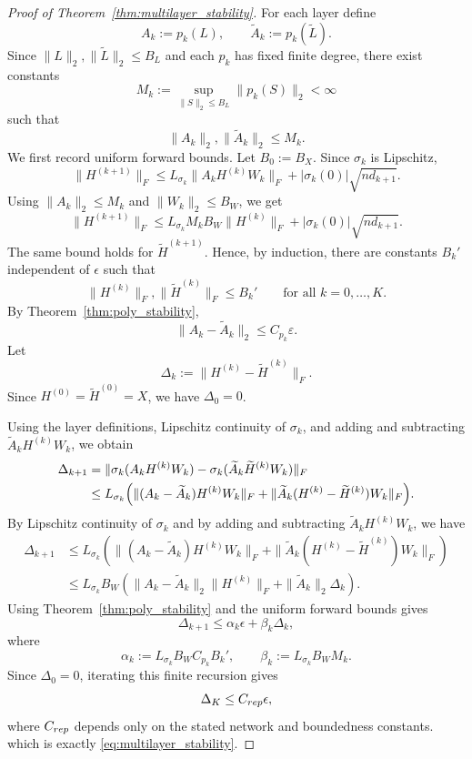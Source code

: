 \documentclass[10pt,a4paper]{amsart}
\begin{document}
\begin{proof}[Proof of Theorem~\ref{thm:multilayer_stability}]
For each layer define
\[
A_k := p_k(L),
\qquad
\widetilde A_k := p_k(\widetilde L).
\]
Since $\|L\|_2,\|\widetilde L\|_2\le B_L$ and each $p_k$ has fixed finite degree, there exist constants
\[
M_k := \sup_{\|S\|_2\le B_L}\|p_k(S)\|_2 < \infty
\]
such that
\[
\|A_k\|_2,\|\widetilde A_k\|_2 \le M_k .
\]
We first record uniform forward bounds. Let $B_0:=B_X$. Since $\sigma_k$ is Lipschitz,
\[
\|H^{(k+1)}\|_F
\le
L_{\sigma_k}\|A_k H^{(k)}W_k\|_F
+
|\sigma_k(0)|\sqrt{n d_{k+1}} .
\]
Using $\|A_k\|_2\le M_k$ and $\|W_k\|_2\le B_W$, we get
\[
\|H^{(k+1)}\|_F
\le
L_{\sigma_k}M_k B_W \|H^{(k)}\|_F
+
|\sigma_k(0)|\sqrt{n d_{k+1}} .
\]
The same bound holds for $\widetilde H^{(k+1)}$. Hence, by induction, there are constants
$B_k'$ independent of $\epsilon$ such that
\[
\|H^{(k)}\|_F,\|\widetilde H^{(k)}\|_F\le B_k'
\qquad
\text{for all }k=0,\ldots,K .
\]
By Theorem~\ref{thm:poly_stability},
\[
\|A_k-\widetilde A_k\|_2 \le C_{p_k}\varepsilon.
\]
Let
\[
\Delta_k := \|H^{(k)}-\widetilde H^{(k)}\|_F.
\]
Since $H^{(0)}=\widetilde H^{(0)}=X$, we have $\Delta_0=0$.

Using the layer definitions, Lipschitz continuity of $\sigma_k$, and adding and subtracting $\widetilde A_k H^{(k)}W_k$, we obtain
\begin{align}
\Delta_{k+1}
&= \|\sigma_k(A_k H^{(k)}W_k)-\sigma_k(\widetilde A_k \widetilde H^{(k)}W_k)\|_F \notag\\
&\le L_{\sigma_k}\Bigl(
\|(A_k-\widetilde A_k)H^{(k)}W_k\|_F
+
\|\widetilde A_k(H^{(k)}-\widetilde H^{(k)})W_k\|_F
\Bigr).
\label{eq:delta_recursion_step}
\end{align}
By Lipschitz continuity of $\sigma_k$ and by adding and subtracting
$\widetilde A_k H^{(k)}W_k$, we have
\[
\begin{aligned}
\Delta_{k+1}
&\le
L_{\sigma_k}
\left(
\|(A_k-\widetilde A_k)H^{(k)}W_k\|_F
+
\|\widetilde A_k(H^{(k)}-\widetilde H^{(k)})W_k\|_F
\right)  \\
&\le
L_{\sigma_k}B_W
\left(
\|A_k-\widetilde A_k\|_2 \|H^{(k)}\|_F
+
\|\widetilde A_k\|_2 \Delta_k
\right).
\end{aligned}
\]
Using Theorem~\ref{thm:poly_stability} and the uniform forward bounds gives
\[
\Delta_{k+1}\le \alpha_k\epsilon+\beta_k\Delta_k ,
\]
where
\[
\alpha_k := L_{\sigma_k}B_W C_{p_k}B_k',
\qquad
\beta_k := L_{\sigma_k}B_W M_k .
\]
Since $\Delta_0=0$, iterating this finite recursion gives
\[
\Delta_K\le C_{\rm rep}\epsilon ,
\]
where $C_{\rm rep}$ depends only on the stated network and boundedness constants.
which is exactly \eqref{eq:multilayer_stability}.
\end{proof}
\end{document}
